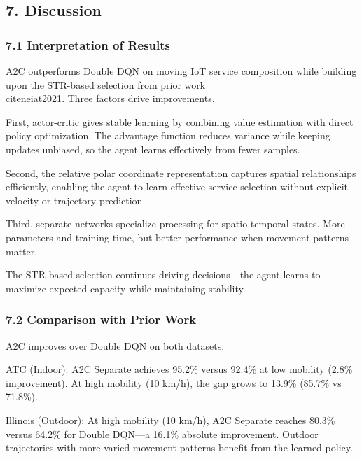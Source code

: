 \subsection{7. Discussion}\label{discussion}

\hypertarget{interpretation-of-results}{%
	\subsubsection{7.1 Interpretation of Results}\label{interpretation-of-results}}

A2C outperforms Double DQN on moving IoT service composition while building upon the STR-based selection from prior work \\cite{neiat2021}. Three factors drive improvements.

First, actor-critic gives stable learning by combining value estimation
with direct policy optimization. The advantage function reduces variance
while keeping updates unbiased, so the agent learns effectively from
fewer samples.

Second, the relative polar coordinate representation captures spatial
relationships efficiently, enabling the agent to learn effective service
selection without explicit velocity or trajectory prediction.

Third, separate networks specialize processing for spatio-temporal
states. More parameters and training time, but better performance when
movement patterns matter.

The STR-based selection continues driving decisions---the agent learns
to maximize expected capacity while maintaining stability.

\hypertarget{comparison-with-prior-work}{%
	\subsubsection{7.2 Comparison with Prior
		Work}\label{comparison-with-prior-work}}

A2C improves over Double DQN on both datasets.

ATC (Indoor): A2C Separate achieves 95.2\% versus 92.4\% at low
mobility (2.8\% improvement). At high mobility (10 km/h), the gap grows
to 13.9\% (85.7\% vs 71.8\%).

Illinois (Outdoor): At high mobility (10 km/h), A2C Separate reaches
80.3\% versus 64.2\% for Double DQN---a 16.1\% absolute improvement.
Outdoor trajectories with more varied movement patterns benefit from
the learned policy.

